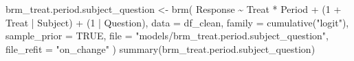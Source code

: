 \documentclass[
  12pt,
  a4paper,
  extrafontsizes,
  onecolumn,
  openright]{memoir}
\newenvironment{Shaded}{\begin{snugshade}}{\end{snugshade}}
\newcommand{\AttributeTok}[1]{\textcolor[rgb]{0.40,0.45,0.13}{#1}}
\newcommand{\ConstantTok}[1]{\textcolor[rgb]{0.56,0.35,0.01}{#1}}
\newcommand{\DecValTok}[1]{\textcolor[rgb]{0.68,0.00,0.00}{#1}}
\newcommand{\FunctionTok}[1]{\textcolor[rgb]{0.28,0.35,0.67}{#1}}
\newcommand{\NormalTok}[1]{\textcolor[rgb]{0.00,0.23,0.31}{#1}}
\newcommand{\OtherTok}[1]{\textcolor[rgb]{0.00,0.23,0.31}{#1}}
\newcommand{\SpecialCharTok}[1]{\textcolor[rgb]{0.37,0.37,0.37}{#1}}
\newcommand{\StringTok}[1]{\textcolor[rgb]{0.13,0.47,0.30}{#1}}
\begin{document}
\begin{Shaded}
\begin{Highlighting}[]
\NormalTok{brm\_treat.period.subject\_question }\OtherTok{\textless{}{-}} \FunctionTok{brm}\NormalTok{(}
\NormalTok{    Response }\SpecialCharTok{\textasciitilde{}}\NormalTok{ Treat }\SpecialCharTok{*}\NormalTok{ Period }\SpecialCharTok{+}\NormalTok{ (}\DecValTok{1} \SpecialCharTok{+}\NormalTok{ Treat }\SpecialCharTok{|}\NormalTok{ Subject) }\SpecialCharTok{+}\NormalTok{ (}\DecValTok{1} \SpecialCharTok{|}\NormalTok{ Question),}
    \AttributeTok{data =}\NormalTok{ df\_clean,}
    \AttributeTok{family =} \FunctionTok{cumulative}\NormalTok{(}\StringTok{"logit"}\NormalTok{),}
    \AttributeTok{sample\_prior =} \ConstantTok{TRUE}\NormalTok{,}
    \AttributeTok{file =} \StringTok{"models/brm\_treat.period.subject\_question"}\NormalTok{,}
    \AttributeTok{file\_refit =} \StringTok{"on\_change"}
\NormalTok{)}
\FunctionTok{summary}\NormalTok{(brm\_treat.period.subject\_question)}
\end{Highlighting}
\end{Shaded}
\end{document}
